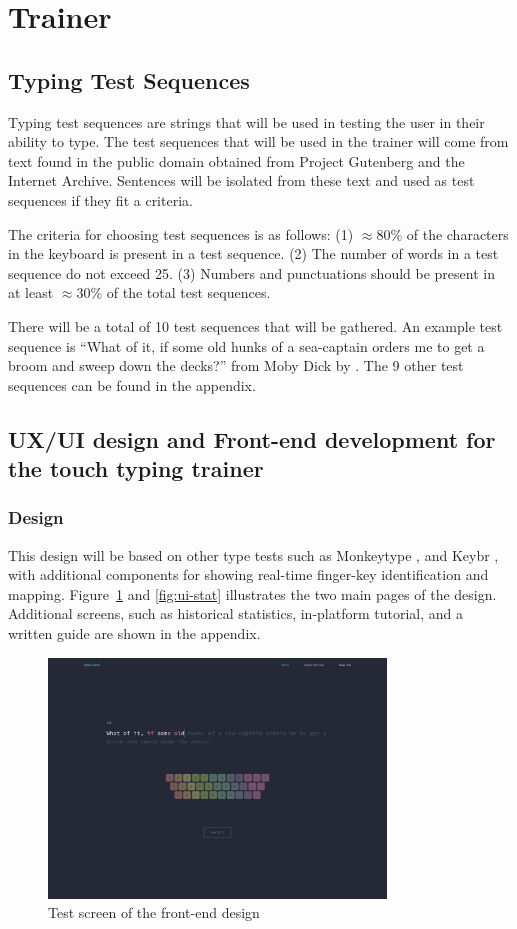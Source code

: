 \documentclass{report}
\begin{document}
\section{Trainer}

\subsection{Typing Test Sequences}
Typing test sequences are strings that will be used in testing the user in their
ability to type. The test sequences that will be used in the trainer will come
from text found in the public domain obtained from Project Gutenberg and the
Internet Archive. Sentences will be isolated from these text and used as test
sequences if they fit a criteria.

The criteria for choosing test sequences is as follows: (1) $\approx80\%$ of the
characters in the keyboard is present in a test sequence. (2) The number of
words in a test sequence do not exceed 25. (3) Numbers and punctuations should
be present in at least $\approx30\%$ of the total test sequences.

There will be a total of 10 test sequences that will be gathered. An example
test sequence is ``What of it, if some old hunks of a sea-captain orders me to
get a broom and sweep down the decks?'' from Moby Dick by \cite{moby-dick}. The
9 other test sequences can be found in the appendix.

\subsection{UX/UI design and Front-end development for the touch typing trainer}
\subsubsection{Design}
This design will be based on other type tests such as Monkeytype
\parencite{bartnik2021}, and Keybr \parencite{keybr}, with additional components
for showing real-time finger-key identification and mapping.
Figure~\ref{fig:ui-test} and \ref{fig:ui-stat} illustrates the two main pages of
the design. Additional screens, such as historical statistics, in-platform
tutorial, and a written guide are shown in the appendix.

\begin{figure}[H]
	\centering
	\includegraphics[width=0.8\textwidth]{ui-test.png}
	\caption{Test screen of the front-end design}
	\label{fig:ui-test}
	\centering
\end{figure}
\end{document}

